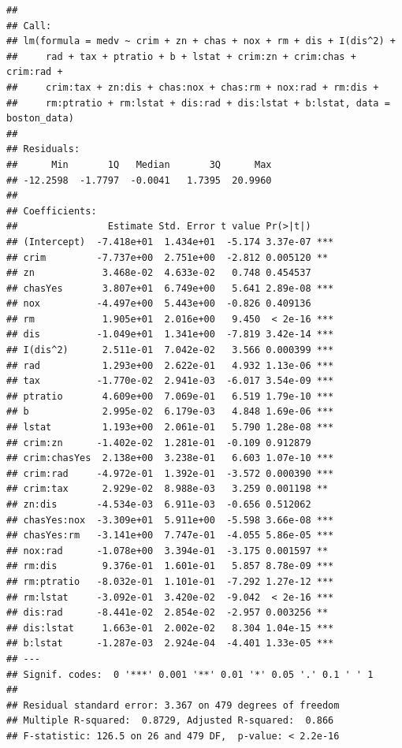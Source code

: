 \documentclass[
]{article}
\begin{document}
\begin{verbatim}
## 
## Call:
## lm(formula = medv ~ crim + zn + chas + nox + rm + dis + I(dis^2) + 
##     rad + tax + ptratio + b + lstat + crim:zn + crim:chas + crim:rad + 
##     crim:tax + zn:dis + chas:nox + chas:rm + nox:rad + rm:dis + 
##     rm:ptratio + rm:lstat + dis:rad + dis:lstat + b:lstat, data = boston_data)
## 
## Residuals:
##      Min       1Q   Median       3Q      Max 
## -12.2598  -1.7797  -0.0041   1.7395  20.9960 
## 
## Coefficients:
##                Estimate Std. Error t value Pr(>|t|)    
## (Intercept)  -7.418e+01  1.434e+01  -5.174 3.37e-07 ***
## crim         -7.737e+00  2.751e+00  -2.812 0.005120 ** 
## zn            3.468e-02  4.633e-02   0.748 0.454537    
## chasYes       3.807e+01  6.749e+00   5.641 2.89e-08 ***
## nox          -4.497e+00  5.443e+00  -0.826 0.409136    
## rm            1.905e+01  2.016e+00   9.450  < 2e-16 ***
## dis          -1.049e+01  1.341e+00  -7.819 3.42e-14 ***
## I(dis^2)      2.511e-01  7.042e-02   3.566 0.000399 ***
## rad           1.293e+00  2.622e-01   4.932 1.13e-06 ***
## tax          -1.770e-02  2.941e-03  -6.017 3.54e-09 ***
## ptratio       4.609e+00  7.069e-01   6.519 1.79e-10 ***
## b             2.995e-02  6.179e-03   4.848 1.69e-06 ***
## lstat         1.193e+00  2.061e-01   5.790 1.28e-08 ***
## crim:zn      -1.402e-02  1.281e-01  -0.109 0.912879    
## crim:chasYes  2.138e+00  3.238e-01   6.603 1.07e-10 ***
## crim:rad     -4.972e-01  1.392e-01  -3.572 0.000390 ***
## crim:tax      2.929e-02  8.988e-03   3.259 0.001198 ** 
## zn:dis       -4.534e-03  6.911e-03  -0.656 0.512062    
## chasYes:nox  -3.309e+01  5.911e+00  -5.598 3.66e-08 ***
## chasYes:rm   -3.141e+00  7.747e-01  -4.055 5.86e-05 ***
## nox:rad      -1.078e+00  3.394e-01  -3.175 0.001597 ** 
## rm:dis        9.376e-01  1.601e-01   5.857 8.78e-09 ***
## rm:ptratio   -8.032e-01  1.101e-01  -7.292 1.27e-12 ***
## rm:lstat     -3.092e-01  3.420e-02  -9.042  < 2e-16 ***
## dis:rad      -8.441e-02  2.854e-02  -2.957 0.003256 ** 
## dis:lstat     1.663e-01  2.002e-02   8.304 1.04e-15 ***
## b:lstat      -1.287e-03  2.924e-04  -4.401 1.33e-05 ***
## ---
## Signif. codes:  0 '***' 0.001 '**' 0.01 '*' 0.05 '.' 0.1 ' ' 1
## 
## Residual standard error: 3.367 on 479 degrees of freedom
## Multiple R-squared:  0.8729, Adjusted R-squared:  0.866 
## F-statistic: 126.5 on 26 and 479 DF,  p-value: < 2.2e-16
\end{verbatim}
\end{document}

